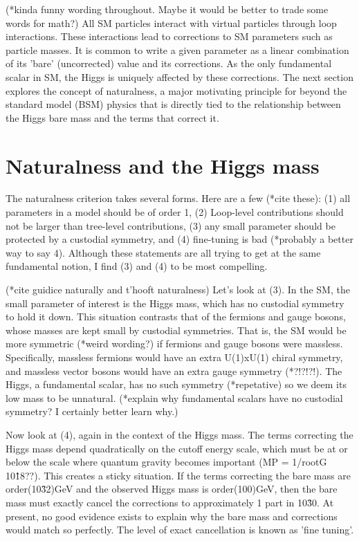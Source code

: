 \documentclass[12pt]{article}
\begin{document}
    (*kinda funny wording throughout. Maybe it would be better to trade some words for math?)
    All SM particles interact with virtual particles through loop interactions. These interactions lead to corrections to SM parameters such as particle masses. It is common to write a given parameter as a linear combination of its 'bare' (uncorrected) value and its corrections. As the only fundamental scalar in SM, the Higgs is uniquely affected by these corrections. The next section explores the concept of naturalness, a major motivating principle for beyond the standard model (BSM) physics that is directly tied to the relationship between the Higgs bare mass and the terms that correct it.

\section{Naturalness and the Higgs mass}
    The naturalness criterion takes several forms. Here are a few (*cite these): (1) all parameters in a model should be of order 1, (2) Loop-level contributions should not be larger than tree-level contributions, (3) any small parameter should be protected by a custodial symmetry, and (4) fine-tuning is bad (*probably a better way to say 4). Although these statements are all trying to get at the same fundamental notion, I find (3) and (4) to be most compelling.

    (*cite guidice naturally and t'hooft naturalness)
    Let's look at (3). In the SM, the small parameter of interest is the Higgs mass, which has no custodial symmetry to hold it down. This situation contrasts that of the fermions and gauge bosons, whose masses are kept small by custodial symmetries. That is, the SM would be more symmetric (*weird wording?) if fermions and gauge bosons were massless. Specifically, massless fermions would have an extra U(1)xU(1) chiral symmetry, and massless vector bosons would have an extra gauge symmetry (*?!?!?!). The Higgs, a fundamental scalar, has no such symmetry (*repetative) so we deem its low mass to be unnatural. (*explain why fundamental scalars have no custodial symmetry? I certainly better learn why.)

    Now look at (4), again in the context of the Higgs mass. The terms correcting the Higgs mass depend quadratically on the cutoff energy scale, which must be at or below the scale where quantum gravity becomes important (MP = 1/rootG ~ 10\^18??). This creates a sticky situation. If the terms correcting the bare mass are order(10\^32)GeV and the observed Higgs mass is order(100)GeV, then the bare mass must exactly cancel the corrections to approximately 1 part in 10\^30. At present, no good evidence exists to explain why the bare mass and corrections would match so perfectly. The level of exact cancellation is known as 'fine tuning'.
\end{document}
